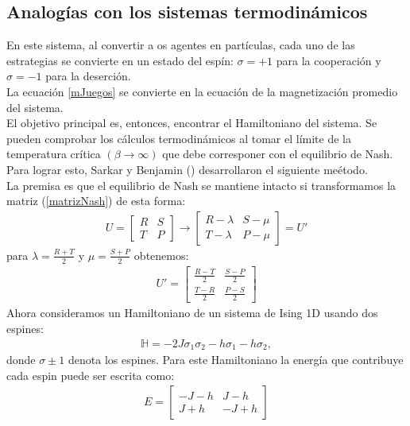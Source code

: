 \documentclass[letterpaper,12pt,oneside]{book}
\begin{document}
\subsection{Analog\'ias con los sistemas termodin\'amicos}
En este sistema, al convertir a os agentes en part\'iculas, cada uno de las estrategias se convierte en un estado del esp\'in: $\sigma = +1$ para la cooperaci\'on y $\sigma = -1$ para la deserci\'on.\\
La ecuaci\'on \ref{mJuegos} se convierte en la ecuaci\'on de la magnetizaci\'on promedio del sistema. \\
El objetivo principal es, entonces, encontrar el Hamiltoniano del sistema. 
Se pueden comprobar los c\'alculos termodin\'amicos al tomar el l\'imite de la temperatura cr\'itica $(\beta \to \infty)$ que debe corresponer con el equilibrio de Nash.
Para lograr esto, Sarkar y Benjamin (\cite{benjamin}) desarrollaron el siguiente me\'etodo.\\
La premisa es que el equilibrio de Nash se mantiene intacto si transformamos la matriz (\ref{matrizNash}) de esta forma:
%
\begin{eqnarray}
  U =
  \begin{bmatrix}
    R & S\\
    T & P
  \end{bmatrix} \to 
  \begin{bmatrix}
    R - \lambda & S - \mu \\
    T - \lambda & P - \mu
  \end{bmatrix} = U'
\end{eqnarray}
%
para $\lambda = \frac{R+T}{2}$ y $\mu = \frac{S+P}{2}$ obtenemos: 
%
\begin{eqnarray}
U' = 
\begin{bmatrix}
  \frac{R-T}{2} & \frac{S-P}{2}\\
  \frac{T-R}{2} & \frac{P-S}{2} 
\end{bmatrix} \label{payoff}
\end{eqnarray}
%
Ahora consideramos un Hamiltoniano de un sistema de Ising 1D usando dos espines: 
%
\begin{eqnarray}
  \mathbb{H}=-2J \sigma_1 \sigma_2 -h\sigma_1 - h\sigma_2, \label{hamilNash}
\end{eqnarray}
%
donde $\sigma \pm 1$  denota los espines. Para este Hamiltoniano la energ\'ia que contribuye cada espin puede ser escrita como:
%
\begin{eqnarray}
  E = \begin{bmatrix}
    -J - h & J- h\\
    J+ h & -J + h
  \end{bmatrix}
\end{eqnarray}
\end{document}
